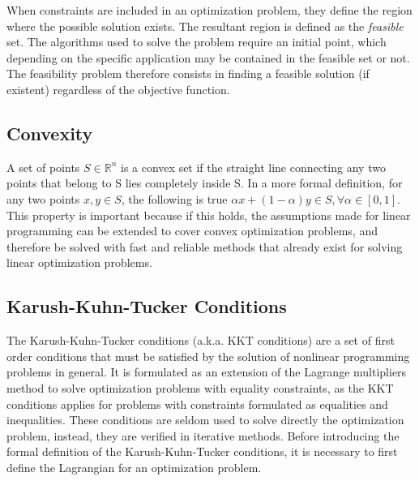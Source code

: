 When constraints are included in an optimization problem, they define the region where the possible solution exists. The resultant region is defined as the \emph{feasible} set.  The algorithms used to solve the problem require an initial point,  which depending on the specific application may be contained in the feasible set or not. The feasibility problem therefore consists in finding a feasible solution (if existent) regardless of the objective function.

\subsection{Convexity}%

A set of points $S \in \mathbb{R}^{n}$ is a convex set if the straight line connecting any two points that belong to S lies completely inside S. In a more formal definition, for any two points $x,y \in S$, the following is true $\alpha x + (1 - \alpha)y \in S, \forall \alpha \in [0,1]$. \\

This property is important because if this holds, the assumptions made for linear programming can be extended to cover convex optimization problems, and therefore be solved with fast and reliable methods that already exist for solving linear optimization problems.

\subsection{Karush-Kuhn-Tucker Conditions}%

The Karush-Kuhn-Tucker conditions (a.k.a. KKT conditions) are a set of first order conditions that must be satisfied by the solution of nonlinear programming problems in general. It is formulated as an extension of the Lagrange multipliers method to solve optimization problems with equality constraints, as the KKT conditions applies for problems with constraints formulated as equalities and inequalities. These conditions are seldom used to solve directly the optimization problem, instead, they are verified in iterative methods. Before introducing the formal definition of the Karush-Kuhn-Tucker conditions, it is necessary to first define the Lagrangian for an optimization problem.\\

